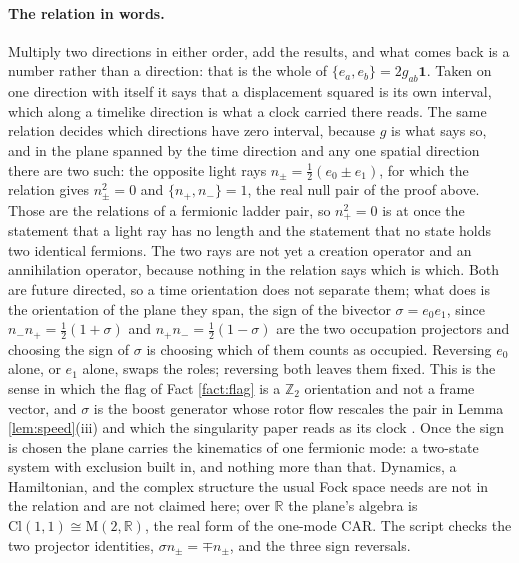 \documentclass[11pt]{article}
\theoremstyle{definition}
\newcommand{\Cl}{\mathrm{Cl}}
\newcommand{\R}{\mathbb{R}}
\newcommand{\Mat}{\mathrm{M}}
\begin{document}
\paragraph{The relation in words.} Multiply two directions in either order, add the results, and what comes back is a number rather than a direction: that is the whole of $\{e_{a}, e_{b}\} = 2g_{ab}\mathbf{1}$. Taken on one direction with itself it says that a displacement squared is its own interval, which along a timelike direction is what a clock carried there reads. The same relation decides which directions have zero interval, because $g$ is what says so, and in the plane spanned by the time direction and any one spatial direction there are two such: the opposite light rays $n_{\pm} = \tfrac12(e_{0} \pm e_{1})$, for which the relation gives $n_{\pm}^{2} = 0$ and $\{n_{+}, n_{-}\} = 1$, the real null pair of the proof above. Those are the relations of a fermionic ladder pair, so $n_{+}^{2} = 0$ is at once the statement that a light ray has no length and the statement that no state holds two identical fermions. The two rays are not yet a creation operator and an annihilation operator, because nothing in the relation says which is which. Both are future directed, so a time orientation does not separate them; what does is the orientation of the plane they span, the sign of the bivector $\sigma = e_{0}e_{1}$, since $n_{-}n_{+} = \tfrac12(1 + \sigma)$ and $n_{+}n_{-} = \tfrac12(1 - \sigma)$ are the two occupation projectors and choosing the sign of $\sigma$ is choosing which of them counts as occupied. Reversing $e_{0}$ alone, or $e_{1}$ alone, swaps the roles; reversing both leaves them fixed. This is the sense in which the flag of Fact \ref{fact:flag} is a $\mathbb{Z}_{2}$ orientation and not a frame vector, and $\sigma$ is the boost generator whose rotor flow rescales the pair in Lemma \ref{lem:speed}(iii) and which the singularity paper reads as its clock \cite{ButlerT5}. Once the sign is chosen the plane carries the kinematics of one fermionic mode: a two-state system with exclusion built in, and nothing more than that. Dynamics, a Hamiltonian, and the complex structure the usual Fock space needs are not in the relation and are not claimed here; over $\R$ the plane's algebra is $\Cl(1,1) \cong \Mat(2, \R)$, the real form of the one-mode CAR. The script checks the two projector identities, $\sigma n_{\pm} = \mp n_{\pm}$, and the three sign reversals.
\end{document}

